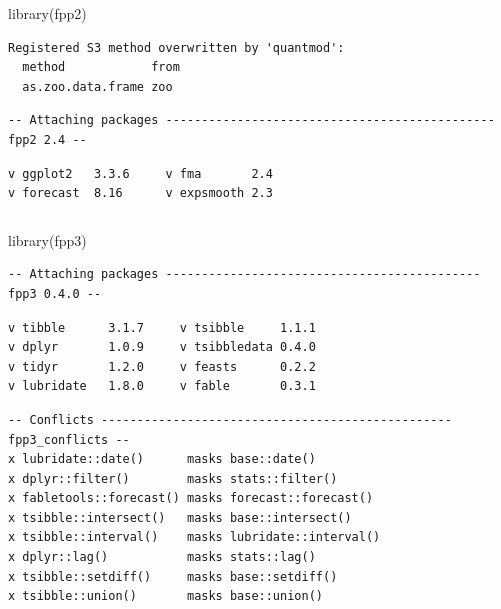\documentclass[
  letterpaper,
  DIV=11,
  numbers=noendperiod]{scrartcl}
\newenvironment{Shaded}{\begin{snugshade}}{\end{snugshade}}
\newcommand{\FunctionTok}[1]{\textcolor[rgb]{0.28,0.35,0.67}{#1}}
\newcommand{\NormalTok}[1]{\textcolor[rgb]{0.00,0.23,0.31}{#1}}
\begin{document}
\begin{Shaded}
\begin{Highlighting}[]
\FunctionTok{library}\NormalTok{(fpp2)}
\end{Highlighting}
\end{Shaded}

\begin{verbatim}
Registered S3 method overwritten by 'quantmod':
  method            from
  as.zoo.data.frame zoo 
\end{verbatim}

\begin{verbatim}
-- Attaching packages ---------------------------------------------- fpp2 2.4 --
\end{verbatim}

\begin{verbatim}
v ggplot2   3.3.6     v fma       2.4  
v forecast  8.16      v expsmooth 2.3  
\end{verbatim}

\begin{verbatim}
\end{verbatim}

\begin{Shaded}
\begin{Highlighting}[]
\FunctionTok{library}\NormalTok{(fpp3)}
\end{Highlighting}
\end{Shaded}

\begin{verbatim}
-- Attaching packages -------------------------------------------- fpp3 0.4.0 --
\end{verbatim}

\begin{verbatim}
v tibble      3.1.7     v tsibble     1.1.1
v dplyr       1.0.9     v tsibbledata 0.4.0
v tidyr       1.2.0     v feasts      0.2.2
v lubridate   1.8.0     v fable       0.3.1
\end{verbatim}

\begin{verbatim}
-- Conflicts ------------------------------------------------- fpp3_conflicts --
x lubridate::date()      masks base::date()
x dplyr::filter()        masks stats::filter()
x fabletools::forecast() masks forecast::forecast()
x tsibble::intersect()   masks base::intersect()
x tsibble::interval()    masks lubridate::interval()
x dplyr::lag()           masks stats::lag()
x tsibble::setdiff()     masks base::setdiff()
x tsibble::union()       masks base::union()
\end{verbatim}
\end{document}
